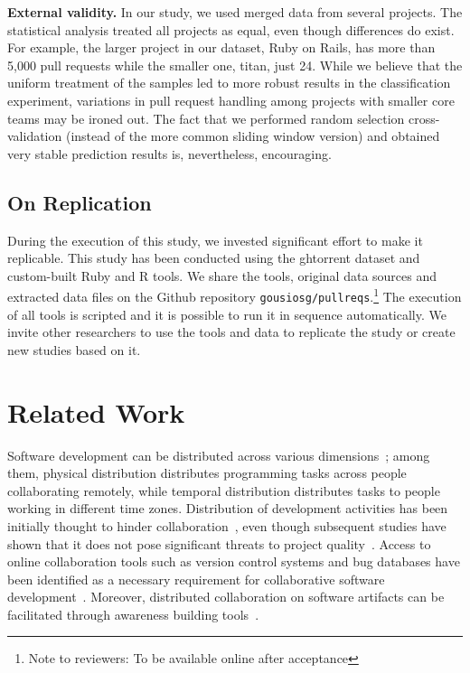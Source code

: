 \documentclass{sig-alternate}
\begin{document}
\textbf{External validity.}
In our study, we used merged data from several projects. The statistical
analysis treated all projects as equal, even though differences do exist.
For example, the larger project in our dataset, Ruby on Rails, 
has more than 5,000 pull requests while the smaller one, \textsf{titan}, just 24.
While we believe that the uniform treatment of the samples led to more robust
results in the classification experiment, variations in pull request
handling among projects with smaller core teams may be ironed out.
The fact that we performed random selection cross-validation (instead
of the more common sliding window version) and obtained very stable prediction
results is, nevertheless, encouraging.

\subsection{On Replication}
During the execution of this study, we invested significant effort to make it
replicable. This study has been conducted using the {\sc ght}orrent dataset and
custom-built Ruby and R tools. We share the tools, original data sources and
extracted data files on the Github repository
\texttt{gousiosg/pullreqs}.\footnote{Note to reviewers: To be available online after acceptance} The
execution of all tools is scripted and it is possible to run it in sequence
automatically. We invite other researchers to use the tools and data to
replicate the study or create new studies based on it.

\section{Related Work}

Software development can be distributed across various
di\-men\-sions~\cite{Gumm06}; among them, physical distribution distributes
programming tasks across people collaborating remotely, while temporal
distribution distributes tasks to people working in different time zones.
Distribution of development activities has been initially thought to hinder
collaboration~\cite{Herbs99, Batti01}, even though subsequent studies have
shown that it does not pose significant threats to project
quality~\cite{Spine06, Nguye08, Bird09a}. Access to online collaboration tools
such as version control systems and bug databases have been identified as a necessary
requirement for collaborative software development~\cite{Catal06}. Moreover, distributed collaboration on software artifacts can be
facilitated through awareness building tools~\cite{Dabbi12, Lanza10}. 
\end{document}
